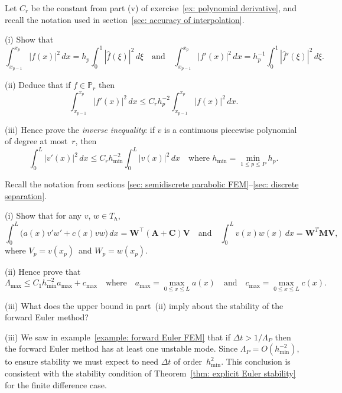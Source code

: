 \begin{Exercises}
\exercise
Let $C_r$ be the constant from part (v) of 
exercise~\ref{ex: polynomial derivative}, and recall the notation used in 
section~\ref{sec: accuracy of interpolation}.
\begin{description}
\item{(i)} Show that 
\[
\int_{x_{p-1}}^{x_p}|f(x)|^2\,dx=h_p\int_0^1|\hat f(\xi)|^2\,d\xi
\quad\text{and}\quad
\int_{x_{p-1}}^{x_p}|f'(x)|^2\,dx=h_p^{-1}\int_0^1|\hat f'(\xi)|^2\,d\xi.
\]
\item{(ii)} Deduce that if $f\in\mathbb{P}_r$ then
\[
\int_{x_{p-1}}^{x_p}|f'(x)|^2\,dx
    \le C_rh_p^{-2}\int_{x_{p-1}}^{x_p}|f(x)|^2\,dx.
\]
\item{(iii)} Hence prove the \emph{inverse inequality}: if $v$ is a continuous 
piecewise polynomial of degree at most~$r$, then
\[
\int_0^L|v'(x)|^2\,dx\le C_rh_{\min}^{-2}\int_0^L|v(x)|^2\,dx
\quad\text{where $h_{\min}=\min_{1\le p\le P}h_p$.}
\]
\end{description}

\exercise
Recall the notation from sections 
\ref{sec: semidiscrete parabolic FEM}--\ref{sec: discrete separation}.
\begin{description}
\item{(i)}
Show that for any $v$, $w\in T_h$,
\[
\int_0^L\bigl(a(x)v'w'+c(x)vw\bigr)\,dx
    =\boldsymbol{W}^\top(\boldsymbol{A}+\boldsymbol{C})\boldsymbol{V}
\quad\text{and}\quad
\int_0^Lv(x)w(x)\,dx=\boldsymbol{W}^T\boldsymbol{M}\boldsymbol{V},
\]
where $V_p=v(x_p)$~and $W_p=w(x_p)$.  
\item{(ii)}
Hence prove that
\[
\Lambda_{\max}\le C_1h_{\min}^{-2}a_{\max}+c_{\max}\quad\text{where}\quad
a_{\max}=\max_{0\le x\le L}a(x)\quad\text{and}\quad
c_{\max}=\max_{0\le x\le L}c(x).
\]
\item{(iii)}
What does the upper bound in part~(ii) imply about the stability of the forward 
Euler method?
\end{description}
\begin{ans}
(iii) We saw in example~\ref{example: forward Euler FEM} that if $\Delta 
t>1/\Lambda_P$ then the forward Euler method has at least one unstable mode.  
Since $\Lambda_P=O(h_{\min}^{-2})$, to ensure stability we must expect to need 
$\Delta t$ of order~$h_{\min}^2$.  This conclusion is consistent with the 
stability condition of Theorem~\ref{thm: explicit Euler stability} for the 
finite difference case.
\end{ans}


\end{Exercises}
